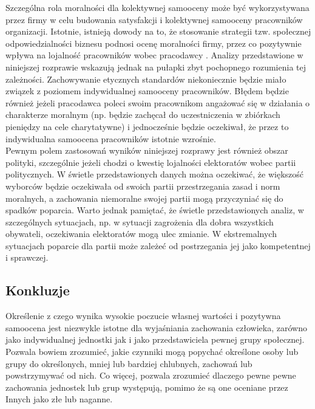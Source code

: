 \documentclass[man]{apa6}
\begin{document}
Szczególna rola moralności dla kolektywnej samooceny może być wykorzystywana przez firmy w celu budowania satysfakcji i kolektywnej samooceny pracowników organizacji. Istotnie, istnieją dowody na to, że stosowanie strategii tzw. społecznej odpowiedzialności biznesu podnosi ocenę moralności firmy, przez co pozytywnie wpływa na lojalność pracowników wobec pracodawcy \parencite{bauman2012corporate, ellemers2011corporate}. Analizy przedstawione w niniejszej rozprawie wskazują jednak na pułapki zbyt pochopnego rozumienia tej zależności. Zachowywanie etycznych standardów niekoniecznie będzie miało związek z poziomem indywidualnej samooceny pracowników. Błędem będzie również jeżeli pracodawca poleci swoim pracownikom angażować się w działania o charakterze moralnym (np. będzie zachęcał do uczestniczenia w zbiórkach pieniędzy na cele charytatywne) i jednocześnie będzie oczekiwał, że przez to indywidualna samoocena pracowników istotnie wzrośnie.\\

Pewnym polem zastosowań wyników niniejszej rozprawy jest również obszar polityki, szczególnie jeżeli chodzi o kwestię  lojalności elektoratów wobec partii politycznych. W świetle przedstawionych danych można oczekiwać, że większość wyborców będzie oczekiwała od swoich partii przestrzegania zasad i norm moralnych, a zachowania niemoralne swojej partii mogą przyczyniać się do spadków poparcia. Warto jednak pamiętać, że świetle przedstawionych analiz, w szczególnych sytuacjach, np. w sytuacji zagrożenia dla dobra wszystkich obywateli, oczekiwania elektoratów mogą ulec zmianie. W ekstremalnych sytuacjach poparcie dla partii może zależeć od postrzegania jej jako kompetentnej i sprawczej.\\

\subsection{Konkluzje}

Określenie z czego wynika wysokie poczucie własnej wartości i pozytywna samoocena jest niezwykle istotne dla wyjaśniania zachowania człowieka, zarówno jako indywidualnej jednostki jak i jako przedstawiciela pewnej grupy społecznej. Pozwala bowiem zrozumieć, jakie czynniki mogą popychać określone osoby lub grupy do określonych, mniej lub bardziej chlubnych, zachowań lub powstrzymywać od nich. Co więcej, pozwala zrozumieć dlaczego pewne pewne zachowania jednostek lub grup występują, pomimo że są one oceniane przez Innych jako złe lub naganne.\\
\end{document}
